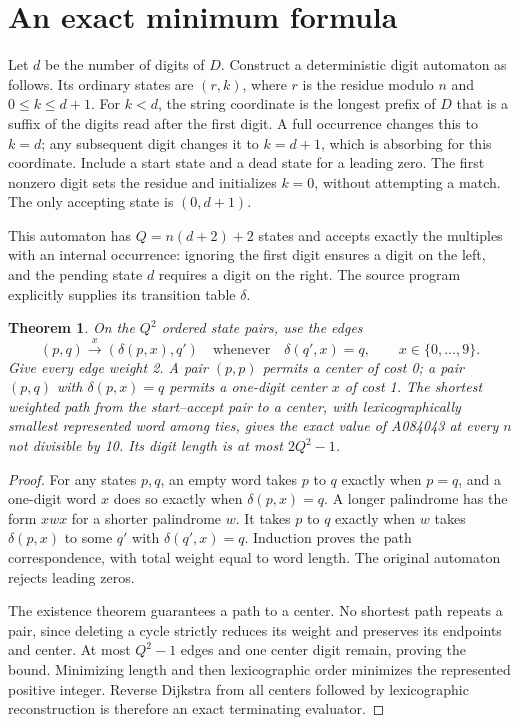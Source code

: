 \documentclass[10pt]{article}
\newtheorem{theorem}{Theorem}
\begin{document}
\section{An exact minimum formula}
Let $d$ be the number of digits of $D$. Construct a deterministic digit automaton as follows. Its ordinary states are $(r,k)$, where $r$ is the residue modulo $n$ and $0\le k\le d+1$. For $k<d$, the string coordinate is the longest prefix of $D$ that is a suffix of the digits read after the first digit. A full occurrence changes this to $k=d$; any subsequent digit changes it to $k=d+1$, which is absorbing for this coordinate. Include a start state and a dead state for a leading zero. The first nonzero digit sets the residue and initializes $k=0$, without attempting a match. The only accepting state is $(0,d+1)$.

This automaton has $Q=n(d+2)+2$ states and accepts exactly the multiples with an internal occurrence: ignoring the first digit ensures a digit on the left, and the pending state $d$ requires a digit on the right. The source program explicitly supplies its transition table $\delta$.
\begin{theorem}
On the $Q^2$ ordered state pairs, use the edges
\[
 (p,q)\xrightarrow{x}(\delta(p,x),q')
 \quad\text{whenever}\quad\delta(q',x)=q,
 \qquad x\in\{0,\ldots,9\}.
\]
Give every edge weight 2. A pair $(p,p)$ permits a center of cost 0; a pair $(p,q)$ with $\delta(p,x)=q$ permits a one-digit center $x$ of cost 1. The shortest weighted path from the start--accept pair to a center, with lexicographically smallest represented word among ties, gives the exact value of A084043 at every $n$ not divisible by 10. Its digit length is at most $2Q^2-1$.
\end{theorem}
\begin{proof}
For any states $p,q$, an empty word takes $p$ to $q$ exactly when $p=q$, and a one-digit word $x$ does so exactly when $\delta(p,x)=q$. A longer palindrome has the form $xwx$ for a shorter palindrome $w$. It takes $p$ to $q$ exactly when $w$ takes $\delta(p,x)$ to some $q'$ with $\delta(q',x)=q$. Induction proves the path correspondence, with total weight equal to word length. The original automaton rejects leading zeros.

The existence theorem guarantees a path to a center. No shortest path repeats a pair, since deleting a cycle strictly reduces its weight and preserves its endpoints and center. At most $Q^2-1$ edges and one center digit remain, proving the bound. Minimizing length and then lexicographic order minimizes the represented positive integer. Reverse Dijkstra from all centers followed by lexicographic reconstruction is therefore an exact terminating evaluator.
\end{proof}
\end{document}
